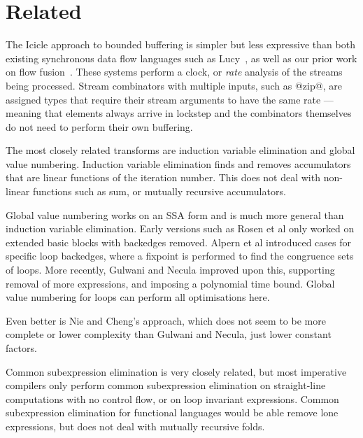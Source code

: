 \section{Related}
\label{s:Related}

The Icicle approach to bounded buffering is simpler but less expressive than both existing synchronous data flow languages such as Lucy~\cite{mandel2010lucy}, as well as our prior work on flow fusion~\cite{lippmeier2013data}. These systems perform a clock, or \emph{rate} analysis of the streams being processed. Stream combinators with multiple inputs, such as @zip@, are assigned types that require their stream arguments to have the same rate --- meaning that elements always arrive in lockstep and the combinators themselves do not need to perform their own buffering.

The most closely related transforms are induction variable elimination\cite{shivers1988control} and global value numbering\cite{rosen1988global}.
Induction variable elimination finds and removes accumulators that are linear functions of the iteration number.
This does not deal with non-linear functions such as sum, or mutually recursive accumulators.

Global value numbering works on an SSA form and is much more general than induction variable elimination.
Early versions such as Rosen et al\cite{rosen1988global} only worked on extended basic blocks with backedges removed.
Alpern et al\cite{alpern1988detecting} introduced cases for specific loop backedges, where a fixpoint is performed to find the congruence sets of loops.
More recently, Gulwani and Necula\cite{gulwani2004polynomial} improved upon this, supporting removal of more expressions, and imposing a polynomial time bound.
Global value numbering for loops can perform all optimisations here.

Even better is Nie and Cheng's approach\cite{nie2007efficient}, which does not seem to be more complete or lower complexity than Gulwani and Necula, just lower constant factors.

Common subexpression elimination is very closely related, but most imperative compilers only perform common subexpression elimination on straight-line computations with no control flow\cite{debray1992compiler}, or on loop invariant expressions\cite{bodik1998complete}.
Common subexpression elimination for functional languages would be able remove lone expressions, but does not deal with mutually recursive folds.

